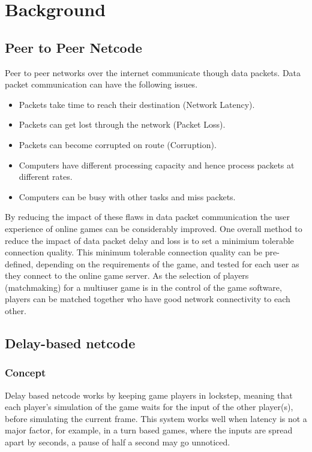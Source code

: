 \documentclass{entcs}
\begin{document}
\section{Background}
\subsection{Peer to Peer Netcode}
Peer to peer networks over the internet communicate though data packets. Data packet communication can have the following issues.
\begin{itemize}
\item{Packets take time to reach their destination (Network Latency).}
\item{Packets can get lost through the network (Packet Loss).}
\item{Packets can become corrupted on route (Corruption).}
\item{Computers have different processing capacity and hence process packets at different rates.}
\item{Computers can be busy with other tasks and miss packets.}
\end{itemize}

By reducing the impact of these flaws in data packet communication the user experience of online games can be considerably improved. One overall method to reduce the impact of data packet delay and loss is to set a minimium tolerable connection quality. This minimum tolerable connection quality can be pre-defined, depending on the requirements of the game, and tested for each user as they connect to the online game server. As the selection of players (matchmaking) for a multiuser game is in the control of the game software, players can be matched together who have good network connectivity to each other. 

\subsection{Delay-based netcode}
\subsubsection{Concept}
Delay based netcode works by keeping game players in lockstep, meaning that each player's simulation of the game waits for the input of the other player(s), before simulating the current frame\cite{DelayBasedNetcode}. This system works well when latency is not a major factor, for example, in a turn based games, where the inputs are spread apart by seconds, a pause of half a second may go unnoticed.
\end{document}
